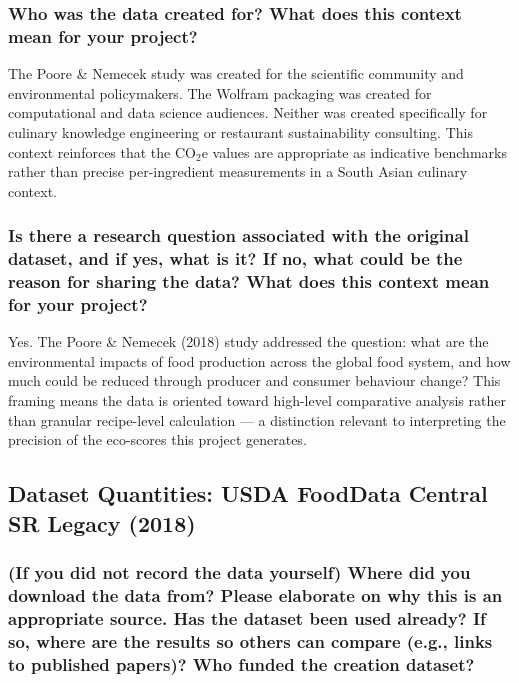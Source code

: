 \documentclass{article}
\newcommand{\question}[1]{#1}
\begin{document}
\question{\subsubsection*{Who was the data created for? What does this context mean for your project?}}

The Poore \& Nemecek study was created for the scientific community and environmental policymakers. The Wolfram packaging was created for computational and data science audiences. Neither was created specifically for culinary knowledge engineering or restaurant sustainability consulting. This context reinforces that the CO$_2$e values are appropriate as indicative benchmarks rather than precise per-ingredient measurements in a South Asian culinary context.

\question{\subsubsection*{Is there a research question associated with the original dataset, and if yes, what is it? If no, what could be the reason for sharing the data? What does this context mean for your project?}}

Yes. The Poore \& Nemecek (2018) study addressed the question: what are the environmental impacts of food production across the global food system, and how much could be reduced through producer and consumer behaviour change? This framing means the data is oriented toward high-level comparative analysis rather than granular recipe-level calculation --- a distinction relevant to interpreting the precision of the eco-scores this project generates.

\subsection*{Dataset Quantities: USDA FoodData Central SR Legacy (2018)}

\question{\subsubsection*{(If you did not record the data yourself) Where did you download the data from? Please elaborate on why this is an appropriate source. Has the dataset been used already? If so, where are the results so others can compare (e.g., links to published papers)? Who funded the creation dataset?}}
\end{document}
